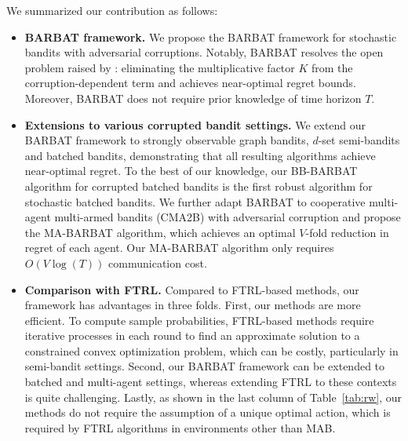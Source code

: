 We summarized our contribution as follows:
\begin{itemize}
    \item \textbf{BARBAT framework.} We propose the BARBAT framework for stochastic bandits with adversarial corruptions. Notably, BARBAT resolves the open problem raised by \citet{gupta2019better}: eliminating the multiplicative factor $K$ from the corruption-dependent term and achieves near-optimal regret bounds. Moreover, BARBAT does not require prior knowledge of time horizon $T$. %
    \item \textbf{Extensions to various corrupted bandit settings.} We extend our BARBAT framework to strongly observable graph bandits, $d$-set semi-bandits and batched bandits, demonstrating that all resulting algorithms achieve near-optimal regret. To the best of our knowledge, our BB-BARBAT algorithm for corrupted batched bandits is the first robust algorithm for stochastic batched bandits. We further adapt BARBAT to cooperative multi-agent multi-armed bandits (CMA2B) with adversarial corruption and propose the MA-BARBAT algorithm, which achieves an optimal $V$-fold reduction in regret of each agent. Our MA-BARBAT algorithm only requires $O(V\log(T))$ communication cost.

    \item \textbf{Comparison with FTRL.} Compared to FTRL-based methods, our framework has advantages in three folds. First, our methods are more efficient. To compute sample probabilities, FTRL-based methods require iterative processes in each round to find an approximate solution to a constrained convex optimization problem, which can be costly, particularly in semi-bandit settings. Second, our BARBAT framework can be extended to batched and multi-agent settings, whereas extending FTRL to these contexts is quite challenging. Lastly, as shown in the last column of Table~\ref{tab:rw}, our methods do not require the assumption of a unique optimal action, which is required by FTRL algorithms in environments other than MAB.

    
\end{itemize}

